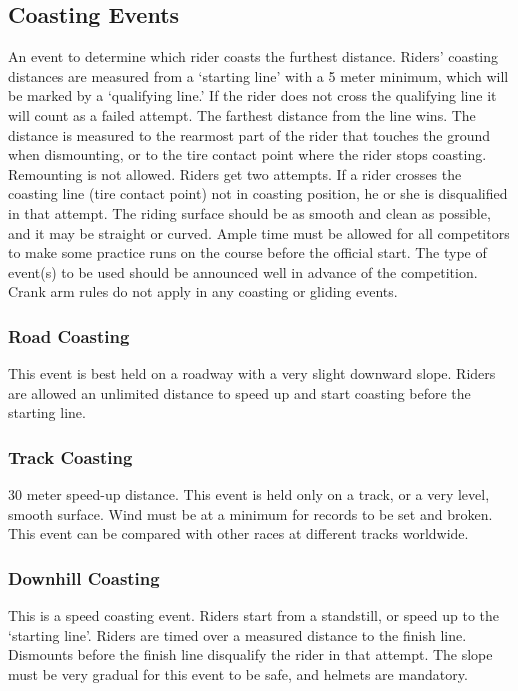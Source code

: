 \subsection{Coasting Events}
An event to determine which rider coasts the furthest distance.
Riders' coasting distances are measured from a `starting line' with a 5 meter minimum, which will be marked by a `qualifying line.'
If the rider does not cross the qualifying line it will count as a failed attempt.
The farthest distance from the line wins.
The distance is measured to the rearmost part of the rider that touches the ground when dismounting, or to the tire contact point where the rider stops coasting.
Remounting is not allowed.
Riders get two attempts.
If a rider crosses the coasting line (tire contact point) not in coasting position, he or she is disqualified in that attempt.
The riding surface should be as smooth and clean as possible, and it may be straight or curved.
Ample time must be allowed for all competitors to make some practice runs on the course before the official start.
The type of event(s) to be used should be announced well in advance of the competition.
Crank arm rules do not apply in any coasting or gliding events.

\subsubsection{Road Coasting}

This event is best held on a roadway with a very slight downward slope.
Riders are allowed an unlimited distance to speed up and start coasting before the starting line.

\subsubsection{Track Coasting \label{subsubsec:track-field_alternate-optional-fun-events_coasting_track-coasting}}
30 meter speed-up distance.
This event is held only on a track, or a very level, smooth surface.
Wind must be at a minimum for records to be set and broken.
This event can be compared with other races at different tracks worldwide.

\subsubsection{Downhill Coasting}
This is a speed coasting event.
Riders start from a standstill, or speed up to the `starting line'.
Riders are timed over a measured distance to the finish line.
Dismounts before the finish line disqualify the rider in that attempt.
The slope must be very gradual for this event to be safe, and helmets are mandatory.

